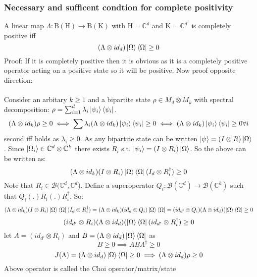 \documentclass{article}
\begin{document}
\subsubsection{Necessary and sufficent condtion for complete positivity}
A linear map $\Lambda: \mathrm{B}(\mathrm{H}) \rightarrow \mathrm{B}(\mathrm{K})$ with $\mathrm{H} = \mathbb{C}^d$ and  $\mathrm{K} = \mathbb{C}^{d'}$  is completely positive iff
$$
(\Lambda \otimes id_d)\ket{\Omega}\bra{\Omega} \geq 0
$$
Proof:
If it is completely positive then it is obvious as it is a completely positive operator acting on a positive state so it will be positive. Now proof opposite direction:\\\\
Consider an arbitary $k \geq 1$ and a bipartite state $\rho \in M_d \otimes M_k$ with spectral decomposition: $\rho = \sum_{i=1}^d \lambda_i \ket{\psi_i} \bra{\psi_i}$.
$$
(\Lambda \otimes id_k)\rho \geq 0 \iff \sum \lambda_i (\Lambda \otimes id_k)\ket{\psi_i}\bra{\psi_i} \geq 0 \iff (\Lambda \otimes id_k)\ket{\psi_i}\bra{\psi_i} \geq 0 \forall i
$$
second iff holds as $\lambda_i \geq 0$. As any bipartite state can be written $\ket{\psi} = (I \otimes R) \ket{\Omega}$. Since $\ket{\Omega_i} \in \mathbb{C}^d \otimes \mathbb{C}^k$ there exists $R_i$ s.t. $\ket{\psi_i} = (I \otimes R_i) \ket{\Omega}$. So the above can be written as:
$$
(\Lambda \otimes id_k)(I \otimes R_i) \ket{\Omega} \bra{\Omega} (I_d \otimes R^{\dagger}_i) \geq 0
$$
Note that $R_i \in \mathcal{B}(\mathbb{C}^d, \mathbb{C}^d$). Define a superoperator $Q_i: \mathcal{B}(\mathbb{C}^d) \rightarrow \mathcal{B}(\mathbb{C}^k)$ such that $Q_i(.) R_i(.)R_i^{\dagger}$. So:
$$
(\Lambda \otimes id_k)(I \otimes R_i) \ket{\Omega} \bra{\Omega} (I_d \otimes R^{\dagger}_i) = (\Lambda \otimes id_k)(id_d \otimes Q_i) \ket{\Omega} \bra{\Omega}= (id_{d'} \otimes Q_i) (\Lambda \otimes id_d)(\ket{\Omega} \bra{\Omega} \geq 0
$$
$$
(id_{d'} \otimes R_i) (\Lambda \otimes id_d)(\ket{\Omega} \bra{\Omega} (id_{d'} \otimes R^{\dagger}_i) \geq 0
$$
let $A= (id_{d'} \otimes R_i) $ and $B = (\Lambda \otimes id_d)\ket{\Omega} \bra{\Omega} $
as
$$
B \geq 0 \implies ABA^{\dagger} \geq 0$$
$$J(\Lambda) = (\Lambda \otimes id_d)\ket{\Omega} \bra{\Omega} \geq 0 \implies (\Lambda \otimes id_d)\rho \geq 0$$
Above operator is called the Choi operator/matrix/state
\end{document}
